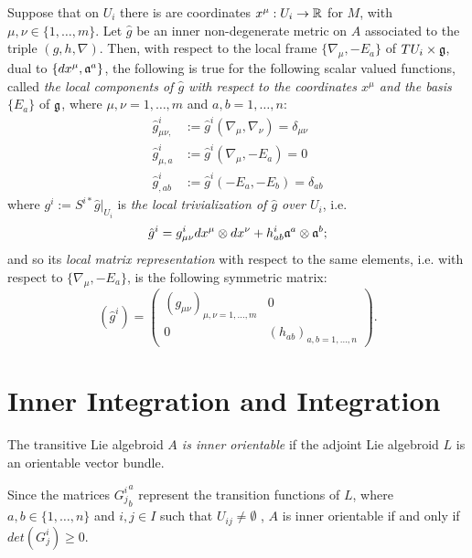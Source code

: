Suppose that on $U_i$ there is are coordinates $x^\mu: U_i \to \mathbb{R}$ for $M$, with $\mu, \nu \in \{1, \dots, m\}$. Let $\hat g$ be an inner non-degenerate metric on $A$ associated to the triple $(g, h, \nabla)$. Then, with respect to the local frame $\{\nabla_\mu, -E_a\}$ of $TU_i \times \mathfrak{g}$, dual to $\{dx^\mu, \mathfrak{a}^a\}$, the following is true for the following scalar valued functions, called \emph{the local components of $\hat g$ with respect to the coordinates $x^\mu$ and the basis $\{E_a\}$} of $\mathfrak{g}$, where $\mu, \nu = 1, \dots, m$ and $a, b = 1, \dots, n$:
\begin{align*}
    \hat g^i_{\mu \nu,}& := \hat g^i(\nabla_\mu, \nabla_\nu) = \delta_{\mu \nu}\\
    \hat g^i_{\mu, a} &:= \hat g^i(\nabla_\mu, -E_a)=0\\
    \hat g^i_{,ab} &:= \hat g^i(-E_a, -E_b) = \delta_{ab}
\end{align*}
where $g^i := S^{i*}\hat g|_{U_i}$ is \emph{the local trivialization of $\hat g$ over $U_i$}, i.e.
\begin{equation}
    \hat g^i = g^i_{\mu \nu} dx^\mu\otimes dx^\nu + h^i_{ab} \mathfrak{a}^a \otimes \mathfrak{a}^b;
\end{equation}
and so its \emph{local matrix representation} with respect to the same elements, i.e. with respect to $\{\nabla_\mu, -E_a\}$, is the following symmetric matrix:
\begin{equation}
    (\hat g^i) = \begin{pmatrix}  (g_{\mu \nu})_{\mu, \nu = 1, \dots, m} & 0 \\ 0 & (h_{a b})_{a, b = 1, \dots, n} \end{pmatrix}.
\end{equation}


\section{Inner Integration and Integration}
\label{chIntegrationSectionIntegration}

\begin{definition}
The transitive Lie algebroid \emph{$A$ is inner orientable} if the adjoint Lie algebroid $L$ is an orientable vector bundle.
\end{definition}

Since the matrices ${G^i_j}^a_b$ represent the transition functions of $L$, where $a, b \in \{1, \dots, n\}$ and $i, j \in I$ such that $U_{ij }\neq \emptyset$ , $A$ is inner orientable if and only if $det({G^i_j}) \geq 0$.

